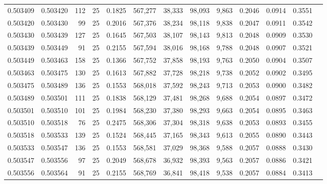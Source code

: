 \begin{tabular}{rrrrrrrrrrrrr}
0.503409 & 0.503420 & 112 &  25 &                                     0.1825 & 567,277 &  38,333 &  98,093 &   9,863 & 0.2046 & 0.0914 & 0.3551 \\
0.503420 & 0.503430 &  99 &  25 &                                     0.2016 & 567,376 &  38,234 &  98,118 &   9,838 & 0.2047 & 0.0911 & 0.3542 \\
0.503430 & 0.503439 & 127 &  25 &                                     0.1645 & 567,503 &  38,107 &  98,143 &   9,813 & 0.2048 & 0.0909 & 0.3530 \\
0.503439 & 0.503449 &  91 &  25 &                                     0.2155 & 567,594 &  38,016 &  98,168 &   9,788 & 0.2048 & 0.0907 & 0.3521 \\
0.503449 & 0.503463 & 158 &  25 &                                     0.1366 & 567,752 &  37,858 &  98,193 &   9,763 & 0.2050 & 0.0904 & 0.3507 \\
0.503463 & 0.503475 & 130 &  25 &                                     0.1613 & 567,882 &  37,728 &  98,218 &   9,738 & 0.2052 & 0.0902 & 0.3495 \\
0.503475 & 0.503489 & 136 &  25 &                                     0.1553 & 568,018 &  37,592 &  98,243 &   9,713 & 0.2053 & 0.0900 & 0.3482 \\
0.503489 & 0.503501 & 111 &  25 &                                     0.1838 & 568,129 &  37,481 &  98,268 &   9,688 & 0.2054 & 0.0897 & 0.3472 \\
0.503501 & 0.503510 & 101 &  25 &                                     0.1984 & 568,230 &  37,380 &  98,293 &   9,663 & 0.2054 & 0.0895 & 0.3463 \\
0.503510 & 0.503518 &  76 &  25 &                                     0.2475 & 568,306 &  37,304 &  98,318 &   9,638 & 0.2053 & 0.0893 & 0.3455 \\
0.503518 & 0.503533 & 139 &  25 &                                     0.1524 & 568,445 &  37,165 &  98,343 &   9,613 & 0.2055 & 0.0890 & 0.3443 \\
0.503533 & 0.503547 & 136 &  25 &                                     0.1553 & 568,581 &  37,029 &  98,368 &   9,588 & 0.2057 & 0.0888 & 0.3430 \\
0.503547 & 0.503556 &  97 &  25 &                                     0.2049 & 568,678 &  36,932 &  98,393 &   9,563 & 0.2057 & 0.0886 & 0.3421 \\
0.503556 & 0.503564 &  91 &  25 &                                     0.2155 & 568,769 &  36,841 &  98,418 &   9,538 & 0.2057 & 0.0884 & 0.3413 \\

\end{tabular}
